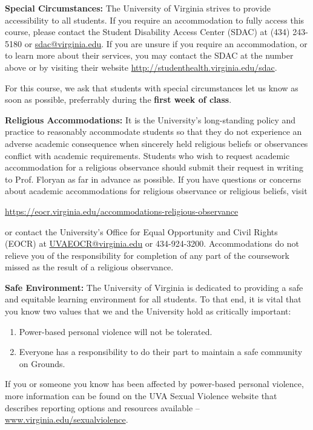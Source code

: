 \documentclass[12pt]{article}
\begin{document}
\textbf{Special Circumstances:} The University of Virginia strives to provide accessibility to all students. If you require an accommodation to fully access this course, please contact the Student Disability Access Center (SDAC) at (434) 243-5180 or \url{sdac@virginia.edu}. If you are unsure if you require an accommodation, or to learn more about their services, you may contact the SDAC at the number above or by visiting their website \url{http://studenthealth.virginia.edu/sdac}.

For this course, we ask that students with special circumstances let us know as soon as possible, preferrably during the \textbf{first week of class}.

\textbf{Religious Accommodations:} It is the University's long-standing policy and practice to reasonably accommodate students so that they do not experience an adverse academic consequence when sincerely held religious beliefs or observances conflict with academic requirements.  Students who wish to request academic accommodation for a religious observance should submit their request in writing to Prof. Floryan as far in advance as possible. If you have questions or concerns about academic accommodations for religious observance or religious beliefs, visit 

\begin{center} 
    \url{https://eocr.virginia.edu/accommodations-religious-observance}
\end{center}

or contact the University's Office for Equal Opportunity and Civil Rights (EOCR) at \url{UVAEOCR@virginia.edu} or 434-924-3200.  Accommodations do not relieve you of the responsibility for completion of any part of the coursework missed as the result of a religious observance.

\textbf{Safe Environment:} The University of Virginia is dedicated to providing a safe and equitable learning environment for all students. To that end, it is vital that you know two values that we and the University hold as critically important:
 
\begin{enumerate}
    \item Power-based personal violence will not be tolerated. 
    \item Everyone has a responsibility to do their part to maintain a safe community on Grounds.
\end{enumerate}

If you or someone you know has been affected by power-based personal violence, more information can be found on the UVA Sexual Violence website that describes reporting options and resources available -- \url{www.virginia.edu/sexualviolence}. 
   
\end{document}
